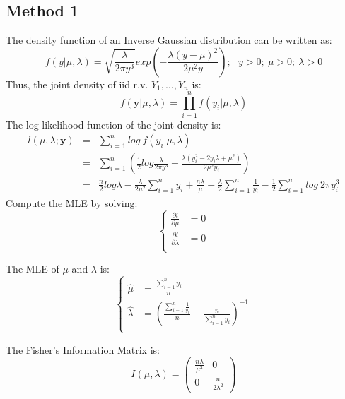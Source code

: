 \documentclass[12pt]{article}
\begin{document}
\subsection{Method 1}
The density function of an Inverse Gaussian distribution can be written as:
$$f(y|\mu,\lambda)=\sqrt{\frac{\lambda}{2 \pi y^3}} exp(-\frac{\lambda (y-\mu)^2}{2\mu^2 y}); \ \ \ y>0; \ \mu>0; \ \lambda >0$$
Thus, the joint density of iid r.v. $Y_1,\dots, Y_n$ is:
$$f(\pmb{y}|\mu,\lambda)=\prod_{i=1}^{n}f(y_i|\mu,\lambda)$$
The log likelihood function of the joint density is:
\begin{eqnarray*}
l(\mu,\lambda; \pmb{y}) & = & \sum_{i=1}^{n}log\ f(y_i|\mu,\lambda) \\
& = & \sum_{i=1}^{n}(\frac{1}{2}log\frac{\lambda}{2\pi y^3}-\frac{\lambda (y_{i}^2-2y_i \lambda+\mu^2)}{2\mu^2 y_i}) \\
& = & \frac{n}{2}log\lambda -\frac{\lambda}{2\mu^2}\sum_{i=1}^{n}y_i + \frac{n\lambda}{\mu} -\frac{\lambda}{2} \sum_{i=1}^{n} \frac{1}{y_i} - \frac{1}{2} \sum_{i=1}^{n} log\ 2\pi y_{i}^3
\end{eqnarray*}
Compute the MLE by solving:
 \begin{equation*}
\left\{                         
\begin{aligned}
\frac{\partial l}{\partial \mu} &= 0\\
\frac{\partial l}{\partial \lambda} &= 0\\
\end{aligned}
\right.
\end{equation*}

The MLE of $\mu$ and $\lambda$ is:
 \begin{equation*}
\left\{                         
\begin{aligned}
\hat{\mu} &= \frac{\sum_{i=1}^{n}y_i}{n}\\
\hat{\lambda} &=(\frac{\sum_{i=1}^{n} \frac{1}{y_i}}{n}-\frac{n}{\sum_{i=1}^{n}y_i})^{-1}\\
\end{aligned}
\right.
\end{equation*}

The Fisher's Information Matrix is:
 \begin{equation*}
 I(\mu,\lambda)=
\left(                        
\begin{matrix}
\frac{n\lambda}{\mu^3} & 0 \\
0 & \frac{n}{2\lambda^2}
\end{matrix}
\right)
\end{equation*}
\end{document}
